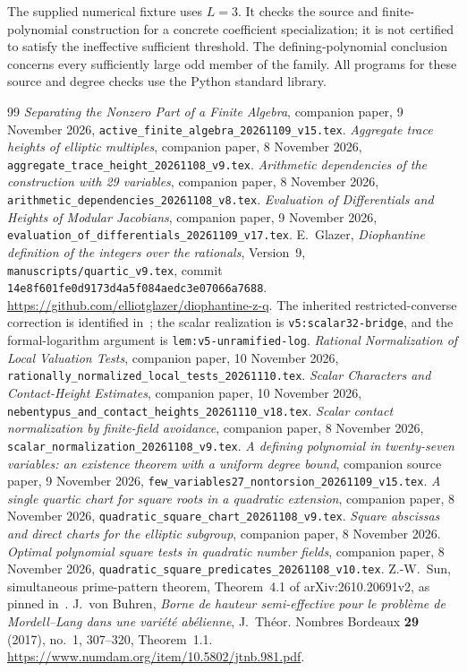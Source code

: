 \documentclass[11pt,a4paper]{article}
\begin{document}
The supplied numerical fixture uses $L=3$. It checks the source
and finite-polynomial construction for a concrete coefficient
specialization; it is not certified to satisfy the ineffective
sufficient threshold. The defining-polynomial conclusion concerns
every sufficiently large odd member of the family. All programs
for these source and degree checks use the Python standard library.

\begin{thebibliography}{99}
\emph{Separating the Nonzero Part of a Finite Algebra},
companion paper, 9 November 2026,
\nolinkurl{active_finite_algebra_20261109_v15.tex}.
\emph{Aggregate trace heights of elliptic multiples},
companion paper, 8 November 2026,
\nolinkurl{aggregate_trace_height_20261108_v9.tex}.
\emph{Arithmetic dependencies of the construction with 29 variables},
companion paper, 8 November 2026,
\nolinkurl{arithmetic_dependencies_20261108_v8.tex}.
\emph{Evaluation of Differentials and Heights of Modular Jacobians},
companion paper, 9 November 2026,
\nolinkurl{evaluation_of_differentials_20261109_v17.tex}.
E.~Glazer, \emph{Diophantine definition of the integers over the
rationals}, Version~9, \nolinkurl{manuscripts/quartic_v9.tex},
commit \nolinkurl{14e8f601fe0d9173d4a5f084aedc3e07066a7688}.
\url{https://github.com/elliotglazer/diophantine-z-q}.
The inherited restricted-converse correction is identified
in~\cite{Dependencies}; the scalar realization is
\nolinkurl{v5:scalar32-bridge}, and the formal-logarithm argument is
\nolinkurl{lem:v5-unramified-log}.
\emph{Rational Normalization of Local Valuation Tests},
companion paper, 10 November 2026,
\nolinkurl{rationally_normalized_local_tests_20261110.tex}.
\emph{Scalar Characters and Contact-Height Estimates},
companion paper, 10 November 2026,
\nolinkurl{nebentypus_and_contact_heights_20261110_v18.tex}.
\emph{Scalar contact normalization by finite-field avoidance},
companion paper, 8 November 2026,
\nolinkurl{scalar_normalization_20261108_v9.tex}.
\emph{A defining polynomial in twenty-seven variables:
an existence theorem with a uniform degree bound},
companion source paper, 9 November 2026,
\nolinkurl{few_variables27_nontorsion_20261109_v15.tex}.
\emph{A single quartic chart for square roots in a quadratic extension},
companion paper, 8 November 2026,
\nolinkurl{quadratic_square_chart_20261108_v9.tex}.
\emph{Square abscissas and direct charts for the elliptic subgroup},
companion paper, 8 November 2026.
\emph{Optimal polynomial square tests in quadratic number fields},
companion paper, 8 November 2026,
\nolinkurl{quadratic_square_predicates_20261108_v10.tex}.
Z.-W.~Sun, simultaneous prime-pattern theorem,
Theorem~4.1 of arXiv:2610.20691v2, as pinned in~\cite{Dependencies}.
J.~von Buhren,
\emph{Borne de hauteur semi-effective pour le probl\`eme de
Mordell--Lang dans une vari\'et\'e ab\'elienne},
J.~Th\'eor. Nombres Bordeaux \textbf{29} (2017), no.~1,
307--320, Theorem~1.1.
\url{https://www.numdam.org/item/10.5802/jtnb.981.pdf}.
\end{thebibliography}
\end{document}
